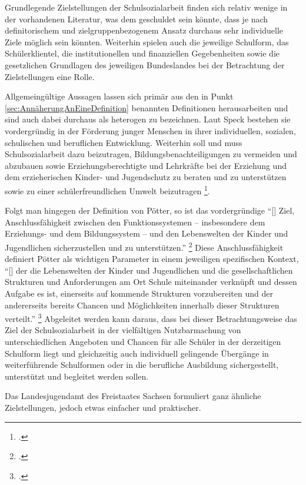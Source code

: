 Grundlegende Zielstellungen der Schulsozialarbeit finden sich relativ wenige in der vorhandenen Literatur, was dem geschuldet sein könnte, dass je nach definitorischem und zielgruppenbezogenem Ansatz durchaus sehr individuelle Ziele möglich sein könnten. Weiterhin spielen auch die jeweilige Schulform, das Schülerklientel, die institutionellen und finanziellen Gegebenheiten sowie die gesetzlichen Grundlagen des jeweiligen Bundeslandes bei der Betrachtung der Zielstellungen eine Rolle. 

Allgemeingültige Aussagen lassen sich primär aus den in Punkt \ref{sec:AnnäherungAnEineDefinition} benannten Definitionen herausarbeiten und sind auch dabei durchaus als heterogen zu bezeichnen. Laut Speck bestehen sie vordergründig in der Förderung junger Menschen in ihrer individuellen, sozialen, schulischen und beruflichen Entwicklung. Weiterhin soll und muss Schulsozialarbeit dazu beizutragen, Bildungsbenachteiligungen zu vermeiden und abzubauen sowie Erziehungsberechtigte und Lehrkräfte bei der Erziehung und dem erzieherischen Kinder- und Jugendschutz zu beraten und zu unterstützen sowie zu einer schülerfreundlichen Umwelt beizutragen \footcite[vgl.][28]{Speck2007}.

Folgt man hingegen der Definition von Pötter, so ist das vordergründige "`[\punkte] Ziel, Anschlussfähigkeit zwischen den Funktionssystemen -- insbesondere dem Erziehungs- und dem Bildungssystem -- und den Lebenswelten der Kinder und Jugendlichen sicherzustellen und zu unterstützen."' \footcite[23]{Poetter2014} Diese Anschlussfähigkeit definiert Pötter als wichtigen Parameter in einem jeweiligen spezifischen Kontext, "`[\punkte] der die Lebenswelten der Kinder und Jugendlichen und die gesellschaftlichen Strukturen und Anforderungen am Ort Schule miteinander verknüpft und dessen Aufgabe es ist, einerseits auf kommende Strukturen vorzubereiten und der andererseits bereits Chancen und Möglichkeiten innerhalb dieser Strukturen verteilt."' \footcite[24]{Poetter2014} Abgeleitet werden kann daraus, dass bei dieser Betrachtungsweise das Ziel der Schulsozialarbeit in der vielfältigen Nutzbarmachung von unterschiedlichen Angeboten und Chancen für alle Schüler in der derzeitigen Schulform liegt und gleichzeitig auch individuell gelingende Übergänge in weiterführende Schulformen oder in die berufliche Ausbildung sichergestellt, unterstützt und begleitet werden sollen.
 
Das Landesjugendamt des Freistaates Sachsen formuliert ganz ähnliche Zielstellungen, jedoch etwas einfacher und praktischer. 

